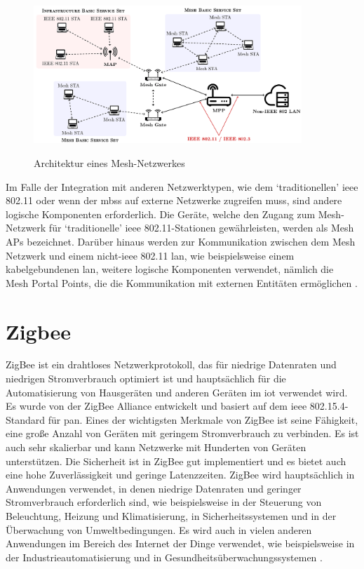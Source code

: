 \documentclass[12pt, a4paper, onecolumn, oneside, toc=bibliographynumbered, liststotoc]{scrreprt} %
\begin{document}
            \begin{figure}[H]
           	\centering
	           \caption{Architektur eines Mesh-Netzwerkes}
	           \includegraphics[width=0.9\textwidth]{MeshNetwork}
		\label{Mesh}
            \end{figure}    

            Im Falle der Integration mit anderen Netzwerktypen, wie dem \enquote*{traditionellen} \ac{ieee} 802.11 oder wenn der \ac{mbss} auf externe Netzwerke zugreifen muss, sind andere logische Komponenten erforderlich. Die Geräte, welche den Zugang zum Mesh-Netzwerk für \enquote*{traditionelle} \ac{ieee} 802.11-Stationen gewährleisten, werden als Mesh APs bezeichnet. Darüber hinaus werden zur Kommunikation zwischen dem Mesh Netzwerk und einem nicht-\ac{ieee} 802.11 \ac{lan}, wie beispielsweise einem kabelgebundenen \ac{lan}, weitere logische Komponenten verwendet, nämlich die Mesh Portal Points, die die Kommunikation mit externen Entitäten ermöglichen \parencite[4-6]{Cilfone.2019}.  %
            
		\section{Zigbee}
            ZigBee ist ein drahtloses Netzwerkprotokoll, das für niedrige Datenraten und niedrigen Stromverbrauch optimiert ist und hauptsächlich für die Automatisierung von Hausgeräten und anderen Geräten im \ac{iot} verwendet wird. Es wurde von der ZigBee Alliance entwickelt und basiert auf dem \ac{ieee} 802.15.4-Standard für \ac{pan}.
            Eines der wichtigsten Merkmale von ZigBee ist seine Fähigkeit, eine große Anzahl von Geräten mit geringem Stromverbrauch zu verbinden. Es ist auch sehr skalierbar und kann Netzwerke mit Hunderten von Geräten unterstützen. Die Sicherheit ist in ZigBee gut implementiert und es bietet auch eine hohe Zuverlässigkeit und geringe Latenzzeiten.
            ZigBee wird hauptsächlich in Anwendungen verwendet, in denen niedrige Datenraten und geringer Stromverbrauch erforderlich sind, wie beispielsweise in der Steuerung von Beleuchtung, Heizung und Klimatisierung, in Sicherheitssystemen und in der Überwachung von Umweltbedingungen. Es wird auch in vielen anderen Anwendungen im Bereich des Internet der Dinge verwendet, wie beispielsweise in der Industrieautomatisierung und in Gesundheitsüberwachungssystemen \parencite[195]{Gessler.2015}. %
\end{document}
